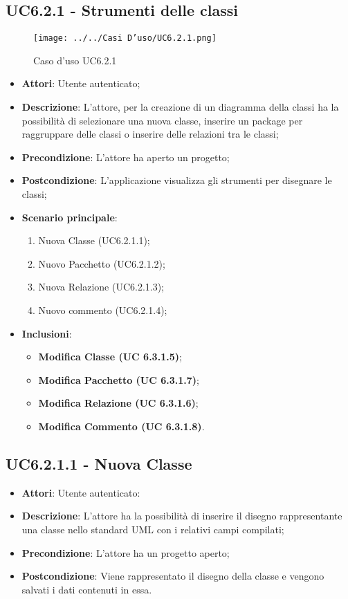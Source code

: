 \subsection{UC6.2.1 - Strumenti delle classi} 
\label{ssec:UC6.2.1}
\begin{figure}[h!] 
\centering 
\texttt{[image: ../../Casi D'uso/UC6.2.1.png]} 
\caption{Caso d'uso UC6.2.1} 
 \end{figure}  
\begin{itemize} 
\item \textbf{Attori}: Utente autenticato;
\item \textbf{Descrizione}: L'attore, per la creazione di un diagramma della classi ha la possibilità di selezionare una nuova classe, inserire un package per raggruppare delle classi o inserire delle relazioni tra le classi;
\item \textbf{Precondizione}: L'attore ha aperto un progetto;
\item \textbf{Postcondizione}: L'applicazione visualizza gli strumenti per disegnare le classi;
\item \textbf{Scenario principale}: \begin{enumerate}\item Nuova Classe (UC6.2.1.1);\item Nuovo Pacchetto (UC6.2.1.2);\item Nuova Relazione (UC6.2.1.3);\item Nuovo commento (UC6.2.1.4); 
 \end{enumerate}
 \item \textbf{Inclusioni}: \begin{itemize}
 	\item \textbf{ Modifica Classe (UC 6.3.1.5)};
 	\item \textbf{ Modifica Pacchetto (UC 6.3.1.7)};
 	\item \textbf{ Modifica Relazione (UC 6.3.1.6)};
 	\item \textbf{ Modifica Commento (UC 6.3.1.8)}.
 \end{itemize}
\end{itemize} 
\subsection{UC6.2.1.1 - Nuova Classe} 
\label{ssec:UC6.2.1.1} 
\begin{itemize} 
\item \textbf{Attori}: Utente autenticato:
\item \textbf{Descrizione}: L'attore ha la possibilità di inserire il disegno rappresentante una classe nello standard UML con i relativi campi compilati;
\item \textbf{Precondizione}: L'attore ha un progetto aperto;
\item \textbf{Postcondizione}: Viene rappresentato il disegno della classe e vengono salvati i dati contenuti in essa.
\end{itemize} 
